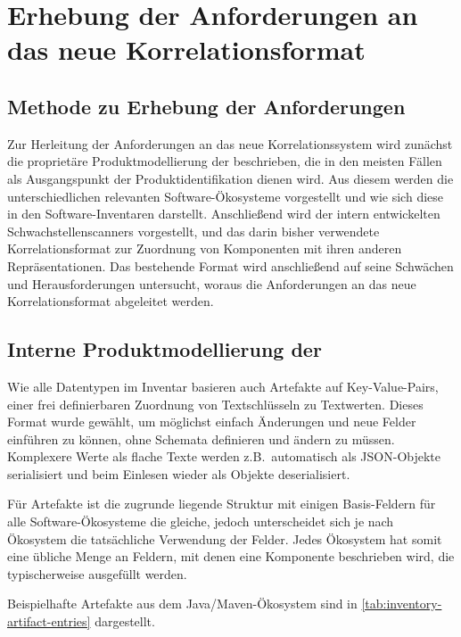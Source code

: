 \chapter{Erhebung der Anforderungen an das neue Korrelationsformat}\label{ch:anforderungen}


\section{Methode zu Erhebung der Anforderungen}

Zur Herleitung der Anforderungen an das neue Korrelationssystem wird zunächst die proprietäre Produktmodellierung der \metaeffektsp beschrieben, die in den meisten Fällen als Ausgangspunkt der Produktidentifikation dienen wird.
Aus diesem werden die unterschiedlichen relevanten Software-Ökosysteme vorgestellt und wie sich diese in den Software-Inventaren darstellt.
Anschließend wird der intern entwickelten Schwachstellenscanners vorgestellt, und das darin bisher verwendete Korrelationsformat zur Zuordnung von Komponenten mit ihren anderen Repräsentationen.
Das bestehende Format wird anschließend auf seine Schwächen und Herausforderungen untersucht, woraus die Anforderungen an das neue Korrelationsformat abgeleitet werden.


\section{Interne Produktmodellierung der \metaeffektlg}\label{sec:metaeffekt-inventory-format}

Wie alle Datentypen im Inventar basieren auch Artefakte auf Key-Value-Pairs, einer frei definierbaren Zuordnung von Textschlüsseln zu Textwerten.
Dieses Format wurde gewählt, um möglichst einfach Änderungen und neue Felder einführen zu können, ohne Schemata definieren und ändern zu müssen.
Komplexere Werte als flache Texte werden z.B.\ automatisch als JSON-Objekte serialisiert und beim Einlesen wieder als Objekte deserialisiert.

Für Artefakte ist die zugrunde liegende Struktur mit einigen Basis-Feldern für alle Software-Ökosysteme die gleiche, jedoch unterscheidet sich je nach Ökosystem die tatsächliche Verwendung der Felder.
Jedes Ökosystem hat somit eine übliche Menge an Feldern, mit denen eine Komponente beschrieben wird, die typischerweise ausgefüllt werden.

Beispielhafte Artefakte aus dem Java/Maven-Ökosystem sind in \autoref{tab:inventory-artifact-entries} dargestellt.

